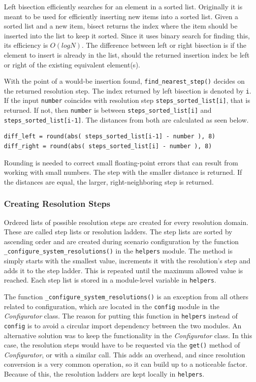 \documentclass[%
    ]{\PathToTumTemplate/thesis/tum_thesis}
\begin{document}
Left bisection efficiently searches for an element in a sorted list.
Originally it is meant to be used for efficiently inserting new items into a sorted list.
Given a sorted list and a new item, bisect returns the index where the item should be inserted into the list to keep it sorted.
Since it uses binary search for finding this, its efficiency is $O(logN)$.
The difference between left or right bisection is if the element to insert is already in the list, should the returned insertion index be left or right of the existing equivalent element(s).

With the point of a would-be insertion found, \lstinline{find_nearest_step()} decides on the returned resolution step.
The index returned by left bisection is denoted by \lstinline{i}.
If the input \texttt{number} coincides with resolution step \lstinline{steps_sorted_list[i]}, that is returned.
If not, then \texttt{number} is between \lstinline{steps_sorted_list[i]} and \lstinline{steps_sorted_list[i-1]}.
The distances from both are calculated as seen below.

\begin{lstlisting}
diff_left = round(abs( steps_sorted_list[i-1] - number ), 8)
diff_right = round(abs( steps_sorted_list[i] - number ), 8)
\end{lstlisting}

Rounding is needed to correct small floating-point errors that can result from working with small numbers.
The step with the smaller distance is returned.
If the distances are equal, the larger, right-neighboring step is returned.

\subsubsection{Creating Resolution Steps}\label{sec:impl_create_steps}

Ordered lists of possible resolution steps are created for every resolution domain.
These are called step lists or resolution ladders.
The step lists are sorted by ascending order and are created during scenario configuration by the function \lstinline{_configure_system_resolutions()} in the \lstinline{helpers} module.
The method is simply starts with the smallest value, increments it with the resolution's step and adds it to the step ladder.
This is repeated until the maximum allowed value is reached.
Each step list is stored in a module-level variable in \lstinline{helpers}.

The function \lstinline{_configure_system_resolutions()} is an exception from all others related to configuration, which are located in the \lstinline{config} module in the \emph{Configurator} class.
The reason for putting this function in \lstinline{helpers} instead of \lstinline{config} is to avoid a circular import dependency between the two modules.
An alternative solution was to keep the functionality in the \emph{Configurator} class.
In this case, the resolution steps would have to be requested via the \lstinline{get()} method of \emph{Configurator}, or with a similar call.
This adds an overhead, and since resolution conversion is a very common operation, so it can build up to a noticeable factor.
Because of this, the resolution ladders are kept locally in \lstinline{helpers}.
\end{document}
